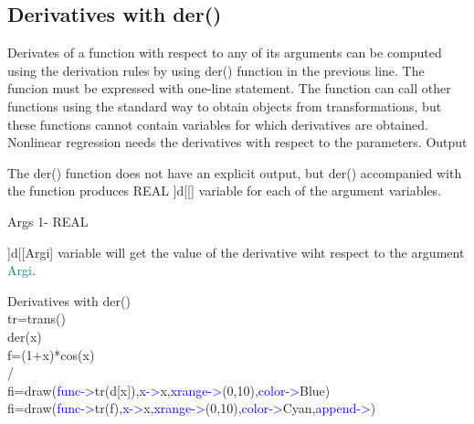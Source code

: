 \subsection{Derivatives with \textcolor{VioletRed}{der}()}
\label{der}
Derivates of a function with respect to any of its arguments can be
computed using the derivation rules by using \textcolor{VioletRed}{der}() function in the previous line. The funcion must be expressed with
one-line statement. The function can call other functions using the standard way
to obtain objects from transformations, but these functions cannot
contain variables for which derivatives are obtained.
Nonlinear regression needs the derivatives with respect to the parameters.
\vspace{0.3cm}
\hline
\vspace{0.3cm}
\noindent Output  \tabto{3cm}    \tabto{5cm}     \tabto{7cm}
\begin{changemargin}{3cm}{0cm}
\noindent  The \textcolor{VioletRed}{der}() function does not have an explicit output, but
\textcolor{VioletRed}{der}() accompanied with the function produces REAL ]d[[] variable for each of the
argument variables.
\end{changemargin}
\vspace{0.3cm}
\hline
\vspace{0.3cm}
\noindent Args  \tabto{3cm} 1-  \tabto{5cm}   REAL  \tabto{7cm}
\begin{changemargin}{3cm}{0cm}
\noindent   ]d[[Argi] variable will get the value of the derivative wiht
respect to the argument \textcolor{teal}{Argi}.
\end {changemargin}
\hline
\vspace{0.2cm}
\begin{example}[derex]Derivatives with \textcolor{VioletRed}{der}()\\
\label{derex}
tr=\textcolor{VioletRed}{trans}()\\
\textcolor{VioletRed}{der}(x)\\
f=(1+x)*cos(x)\\
/\\
fi=\textcolor{VioletRed}{draw}(\textcolor{blue}{func->}tr(d[x]),\textcolor{blue}{x->}x,\textcolor{blue}{xrange->}(0,10),\textcolor{blue}{color->}Blue)\\
fi=\textcolor{VioletRed}{draw}(\textcolor{blue}{func->}tr(f),\textcolor{blue}{x->}x,\textcolor{blue}{xrange->}(0,10),\textcolor{blue}{color->}Cyan,\textcolor{blue}{append->})
\end{example}
